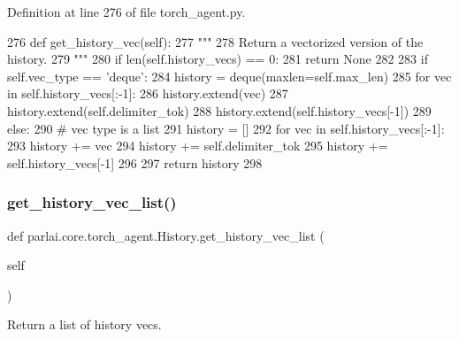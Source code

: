 Definition at line 276 of file torch\+\_\+agent.\+py.


\begin{DoxyCode}
276     \textcolor{keyword}{def }get\_history\_vec(self):
277         \textcolor{stringliteral}{"""}
278 \textcolor{stringliteral}{        Return a vectorized version of the history.}
279 \textcolor{stringliteral}{        """}
280         \textcolor{keywordflow}{if} len(self.history\_vecs) == 0:
281             \textcolor{keywordflow}{return} \textcolor{keywordtype}{None}
282 
283         \textcolor{keywordflow}{if} self.vec\_type == \textcolor{stringliteral}{'deque'}:
284             history = deque(maxlen=self.max\_len)
285             \textcolor{keywordflow}{for} vec \textcolor{keywordflow}{in} self.history\_vecs[:-1]:
286                 history.extend(vec)
287                 history.extend(self.delimiter\_tok)
288             history.extend(self.history\_vecs[-1])
289         \textcolor{keywordflow}{else}:
290             \textcolor{comment}{# vec type is a list}
291             history = []
292             \textcolor{keywordflow}{for} vec \textcolor{keywordflow}{in} self.history\_vecs[:-1]:
293                 history += vec
294                 history += self.delimiter\_tok
295             history += self.history\_vecs[-1]
296 
297         \textcolor{keywordflow}{return} history
298 
\end{DoxyCode}
\mbox{\label{classparlai_1_1core_1_1torch__agent_1_1History_a117862fe92da69172cb8e0c494bcd280}} 
\subsubsection{\texorpdfstring{get\+\_\+history\+\_\+vec\+\_\+list()}{get\_history\_vec\_list()}}
{\footnotesize\ttfamily def parlai.\+core.\+torch\+\_\+agent.\+History.\+get\+\_\+history\+\_\+vec\+\_\+list (\begin{DoxyParamCaption}\item[{}]{self }\end{DoxyParamCaption})}

\begin{DoxyVerb}Return a list of history vecs.
\end{DoxyVerb}
 

